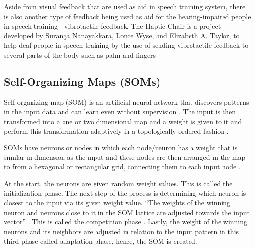 Aside from visual feedback that are used as aid in speech training system, there is also another type of feedback being used as aid for the hearing-impaired people in speech training - vibrotactile feedback. The Haptic Chair is a project developed by Suranga Nanayakkara, Lonce Wyse, and Elizabeth A. Taylor, to help deaf people in speech training by the use of sending vibrotactile feedback to several parts of the body such as palm and fingers \cite{nanaya:2012:hap}.

\subsection{Self-Organizing Maps (SOMs)}

Self-organizing map (SOM) is an artificial neural network that discovers patterns in the input data and can learn even without supervision \cite{agustin:2014:SOM}. The input is then transformed into a one or two dimensional map and a weight is given to it and perform this transformation adaptively in a topologically ordered fashion \cite{chandar:2013:srs}.

SOMs have neurons or nodes in which each node/neuron has a weight that is similar in dimension as the input and these nodes are then arranged in the map to from a hexagonal or rectangular grid, connecting them to each input node \cite{agustin:2014:SOM}.

At the start, the neurons are given random weight values. This is called the initialization phase. The next step of the process is determining which neuron is closest to the input via its given weight value. “The weights of the winning neuron and neurons close to it in the SOM lattice are adjusted towards the input vector” \cite{chandar:2013:srs}. This is called the competition phase \cite{agustin:2014:SOM}. Lastly, the weight of the winning neurons and its neighbors are adjusted in relation to the input pattern in this third phase called adaptation phase, hence, the SOM is created.